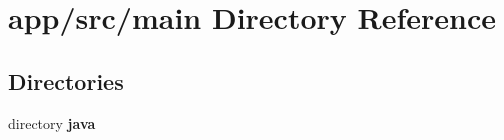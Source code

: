 \section{app/src/main Directory Reference}
\label{dir_b666c07c1496f162cb9d3dc31a043164}
\subsection*{Directories}
\begin{DoxyCompactItemize}
\item 
directory {\bf java}
\end{DoxyCompactItemize}
